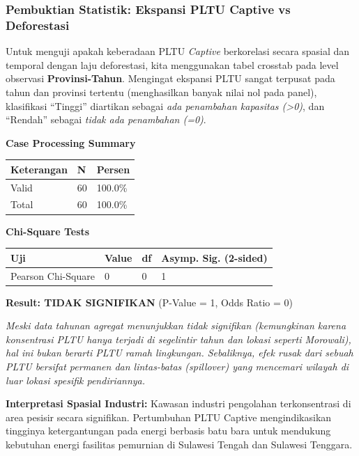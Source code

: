\documentclass[
]{article}
\newcounter{none} %
\begin{document}
\subsubsection{Pembuktian Statistik: Ekspansi PLTU Captive vs
Deforestasi}\label{pembuktian-statistik-ekspansi-pltu-captive-vs-deforestasi}

Untuk menguji apakah keberadaan PLTU \emph{Captive} berkorelasi secara
spasial dan temporal dengan laju deforestasi, kita menggunakan tabel
crosstab pada level observasi \textbf{Provinsi-Tahun}. Mengingat
ekspansi PLTU sangat terpusat pada tahun dan provinsi tertentu
(menghasilkan banyak nilai nol pada panel), klasifikasi ``Tinggi''
diartikan sebagai \emph{ada penambahan kapasitas (\textgreater0)}, dan
``Rendah'' sebagai \emph{tidak ada penambahan (=0)}.

\textbf{Case Processing Summary}

{\def\LTcaptype{none} %
\begin{longtable}[]{@{}lll@{}}
\toprule\noalign{}
Keterangan & N & Persen \\
\midrule\noalign{}
\endhead
\bottomrule\noalign{}
\endlastfoot
Valid & 60 & 100.0\% \\
Total & 60 & 100.0\% \\
\end{longtable}
}

\textbf{Chi-Square Tests}

{\def\LTcaptype{none} %
\begin{longtable}[]{@{}llll@{}}
\toprule\noalign{}
Uji & Value & df & Asymp. Sig. (2-sided) \\
\midrule\noalign{}
\endhead
\bottomrule\noalign{}
\endlastfoot
Pearson Chi-Square & 0 & 0 & 1 \\
\end{longtable}
}

\textbf{Result: TIDAK SIGNIFIKAN} (P-Value = 1, Odds Ratio = 0)

\emph{Meski data tahunan agregat menunjukkan tidak signifikan
(kemungkinan karena konsentrasi PLTU hanya terjadi di segelintir tahun
dan lokasi seperti Morowali), hal ini bukan berarti PLTU ramah
lingkungan. Sebaliknya, efek rusak dari sebuah PLTU bersifat permanen
dan lintas-batas (spillover) yang mencemari wilayah di luar lokasi
spesifik pendiriannya.}

\textbf{Interpretasi Spasial Industri:} Kawasan industri pengolahan
terkonsentrasi di area pesisir secara signifikan. Pertumbuhan PLTU
Captive mengindikasikan tingginya ketergantungan pada energi berbasis
batu bara untuk mendukung kebutuhan energi fasilitas pemurnian di
Sulawesi Tengah dan Sulawesi Tenggara.
\end{document}

